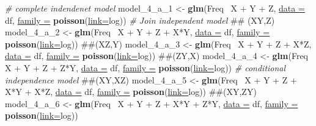 \documentclass[]{article}
\newenvironment{Shaded}{\begin{snugshade}}{\end{snugshade}}
\newcommand{\KeywordTok}[1]{\textcolor[rgb]{0.26,0.66,0.93}{\textbf{{#1}}}}
\newcommand{\DataTypeTok}[1]{\textcolor[rgb]{0.74,0.68,0.62}{\underline{{#1}}}}
\newcommand{\StringTok}[1]{\textcolor[rgb]{0.02,0.61,0.04}{{#1}}}
\newcommand{\CommentTok}[1]{\textcolor[rgb]{0.00,0.40,1.00}{\textit{{#1}}}}
\newcommand{\NormalTok}[1]{\textcolor[rgb]{0.74,0.68,0.62}{{#1}}}
\begin{document}
\begin{Shaded}
\begin{Highlighting}[]
\CommentTok{# complete indendenet model}
\NormalTok{model_4_a_1 <-}\StringTok{ }\KeywordTok{glm}\NormalTok{(Freq~}\StringTok{ }\NormalTok{X +}\StringTok{ }\NormalTok{Y +}\StringTok{ }\NormalTok{Z, }\DataTypeTok{data =} \NormalTok{df, }\DataTypeTok{family  =} \KeywordTok{poisson}\NormalTok{(}\DataTypeTok{link=}\NormalTok{log))}
\CommentTok{# Join independent model}
\NormalTok{## (XY,Z)}
\NormalTok{model_4_a_2 <-}\StringTok{ }\KeywordTok{glm}\NormalTok{(Freq~}\StringTok{ }\NormalTok{X +}\StringTok{ }\NormalTok{Y +}\StringTok{ }\NormalTok{Z +}\StringTok{ }\NormalTok{X*Y, }
                    \DataTypeTok{data =} \NormalTok{df, }\DataTypeTok{family  =} \KeywordTok{poisson}\NormalTok{(}\DataTypeTok{link=}\NormalTok{log))}
\NormalTok{##(XZ,Y)}
\NormalTok{model_4_a_3 <-}\StringTok{ }\KeywordTok{glm}\NormalTok{(Freq~}\StringTok{ }\NormalTok{X +}\StringTok{ }\NormalTok{Y +}\StringTok{ }\NormalTok{Z +}\StringTok{ }\NormalTok{X*Z, }
                    \DataTypeTok{data =} \NormalTok{df, }\DataTypeTok{family  =} \KeywordTok{poisson}\NormalTok{(}\DataTypeTok{link=}\NormalTok{log))}
\NormalTok{##(ZY,X)}
\NormalTok{model_4_a_4 <-}\StringTok{ }\KeywordTok{glm}\NormalTok{(Freq~}\StringTok{ }\NormalTok{X +}\StringTok{ }\NormalTok{Y +}\StringTok{ }\NormalTok{Z +}\StringTok{ }\NormalTok{Z*Y, }
                    \DataTypeTok{data =} \NormalTok{df, }\DataTypeTok{family  =} \KeywordTok{poisson}\NormalTok{(}\DataTypeTok{link=}\NormalTok{log))}
\CommentTok{# conditional independence model }
\NormalTok{##(XY,XZ)}
\NormalTok{model_4_a_5 <-}\StringTok{ }\KeywordTok{glm}\NormalTok{(Freq~}\StringTok{ }\NormalTok{X +}\StringTok{ }\NormalTok{Y +}\StringTok{ }\NormalTok{Z +}\StringTok{ }\NormalTok{X*Y +}\StringTok{ }\NormalTok{X*Z, }
                    \DataTypeTok{data =} \NormalTok{df, }\DataTypeTok{family  =} \KeywordTok{poisson}\NormalTok{(}\DataTypeTok{link=}\NormalTok{log))}
\NormalTok{##(XY,ZY)}
\NormalTok{model_4_a_6 <-}\StringTok{ }\KeywordTok{glm}\NormalTok{(Freq~}\StringTok{ }\NormalTok{X +}\StringTok{ }\NormalTok{Y +}\StringTok{ }\NormalTok{Z +}\StringTok{ }\NormalTok{X*Y +}\StringTok{ }\NormalTok{Z*Y, }
                    \DataTypeTok{data =} \NormalTok{df, }\DataTypeTok{family  =} \KeywordTok{poisson}\NormalTok{(}\DataTypeTok{link=}\NormalTok{log))}


\end{Highlighting}
\end{Shaded}
\end{document}
